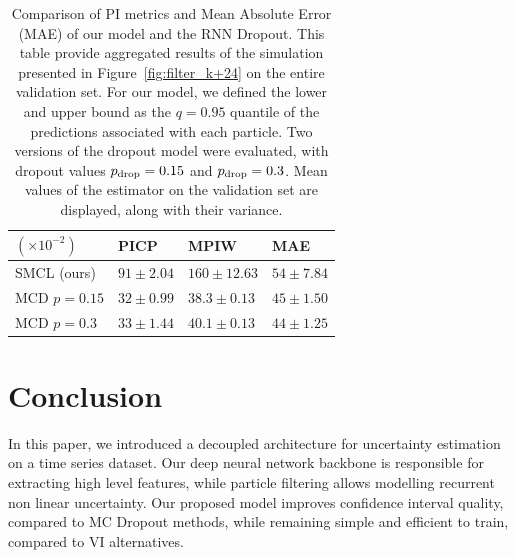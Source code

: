 \documentclass{article}
\begin{document}
\begin{table}[htpb]
	\centering
	\caption{Comparison of PI metrics and Mean Absolute Error (MAE) of our model and the RNN Dropout. This table provide aggregated results of the simulation presented in Figure~\ref{fig:filter_k+24} on the entire validation set. For our model, we defined the lower and upper bound as the $q=0.95$ quantile of the predictions associated with each particle. Two versions of the dropout model were evaluated, with dropout values $p_\textnormal{drop}=0.15$ and $p_\textnormal{drop}=0.3$. Mean values of the estimator on the validation set are displayed, along with their variance.}
	\label{tab:ci_comparison}
	\begin{tabular}{llll}
		\toprule
		$(\times 10^{-2})$ & PICP          & MPIW            & MAE           \\
		\toprule
		SMCL (ours)        & $91 \pm 2.04$ & $160 \pm 12.63$ & $54 \pm 7.84$ \\
		MCD $p=0.15$       & $32 \pm 0.99$ & $38.3 \pm 0.13$ & $45 \pm 1.50$ \\
		MCD $p=0.3$        & $33 \pm 1.44$ & $40.1 \pm 0.13$ & $44 \pm 1.25$ \\
		\bottomrule
	\end{tabular}
\end{table}


\section{Conclusion}%
\label{sec:conclusion}

In this paper, we introduced a decoupled architecture for uncertainty estimation on a time series dataset.
Our deep neural network backbone is responsible for extracting high level features, while particle filtering allows modelling recurrent non linear uncertainty.
Our proposed model improves confidence interval quality, compared to MC Dropout methods, while remaining simple and efficient to train, compared to VI alternatives.
\end{document}

